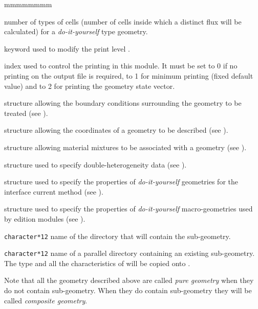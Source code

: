 \begin{ListeDeDescription}{mmmmmmmm}
\item[\dusa{lp}] number of types of cells (number of cells inside which a distinct flux will be calculated) for a \textsl{do-it-yourself} type geometry.

\item[\moc{EDIT}] keyword used to modify the print level .

\item[\dusa{iprint}] index used to control the printing in this module.
It must be set to 0 if no printing on the output file is required, to 1 for
minimum printing (fixed default value) and to 2 for printing the geometry state
vector.

\item[\dstr{descBC}] structure allowing the boundary conditions surrounding
the geometry to be treated (see ).

\item[\dstr{descSP}] structure allowing the coordinates of a geometry to be
described (see ).

\item[\dstr{descPP}] structure allowing material mixtures to be associated
with a geometry (see ).

\item[\dstr{descDH}] structure used to specify double-heterogeneity data (see ).

\item[\dstr{descSIJ}] structure used to specify the properties of {\sl do-it-yourself}
geometries for the interface current method (see ).

\item[\dstr{descMACRO}] structure used to specify the properties of {\sl do-it-yourself}
macro-geometries used by edition modules (see ).

\item[\dusa{SUBGEO}] {\tt character*12} name of the directory  that will
contain the sub-geometry.

\item[\dusa{OLDGEO}] {\tt character*12} name of a parallel directory
containing an existing sub-geometry. The type and all the characteristics of
 will be copied onto .

\end{ListeDeDescription}

Note that all the geometry described above are called {\sl pure geometry} when
they do not contain sub-geometry. When they do contain sub-geometry they will be
called {\sl composite geometry}. 

